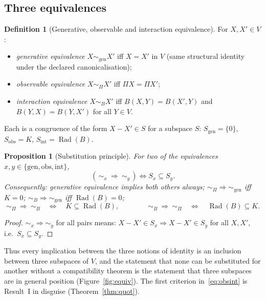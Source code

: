 \documentclass[11pt,a4paper]{article}
\newcommand{\Rad}{\operatorname{Rad}}
\newcommand{\obseq}{\sim_{\Pi}}
\newcommand{\inteq}{\sim_{B}}
\newcommand{\geneq}{\sim_{\mathrm{gen}}}
\theoremstyle{plain}
\newtheorem{proposition}[theorem]{Proposition}
\theoremstyle{definition}
\newtheorem{definition}[theorem]{Definition}
\begin{document}
\subsection{Three equivalences}
\begin{definition}[Generative, observable and interaction equivalence]\label{def:three}
For $X,X'\in V$:
\begin{itemize}
\item \emph{generative equivalence} $X\geneq X'$ iff $X=X'$ in $V$ (same structural identity under the declared canonicalisation);
\item \emph{observable equivalence} $X\obseq X'$ iff $\Pi X=\Pi X'$;
\item \emph{interaction equivalence} $X\inteq X'$ iff $B(X,Y)=B(X',Y)$ and $B(Y,X)=B(Y,X')$ for all $Y\in V$.
\end{itemize}
\end{definition}
Each is a congruence of the form $X-X'\in S$ for a subspace $S$:
$S_{\mathrm{gen}}=\{0\}$, $S_{\mathrm{obs}}=K$, $S_{\mathrm{int}}=\Rad(B)$.

\begin{proposition}[Substitution principle]\label{prop:subst}
For two of the equivalences $x,y\in\{\mathrm{gen},\mathrm{obs},\mathrm{int}\}$,
\[ (\,\sim_x\ \Rightarrow\ \sim_y\,)\iff S_x\subseteq S_y. \]
Consequently: generative equivalence implies both others always; $\obseq\Rightarrow\geneq$ iff $K=0$; $\inteq\Rightarrow\geneq$ iff $\Rad(B)=0$;
\begin{equation}\label{eq:obsint}
\obseq\ \Rightarrow\ \inteq\quad\iff\quad K\subseteq\Rad(B),\qquad\qquad \inteq\ \Rightarrow\ \obseq\quad\iff\quad\Rad(B)\subseteq K.
\end{equation}
\end{proposition}
\begin{proof}
$\sim_x\Rightarrow\sim_y$ for all pairs means: $X-X'\in S_x\Rightarrow X-X'\in S_y$ for all $X,X'$, i.e.\ $S_x\subseteq S_y$.
\end{proof}
Thus every implication between the three notions of identity is an inclusion between three subspaces of $V$, and the statement that none can be substituted for another without a compatibility theorem is the statement that three subspaces are in general position (Figure~\ref{fig:equiv}).
The first criterion in~\eqref{eq:obsint} is Result~I in disguise (Theorem~\ref{thm:quot}).
\end{document}
